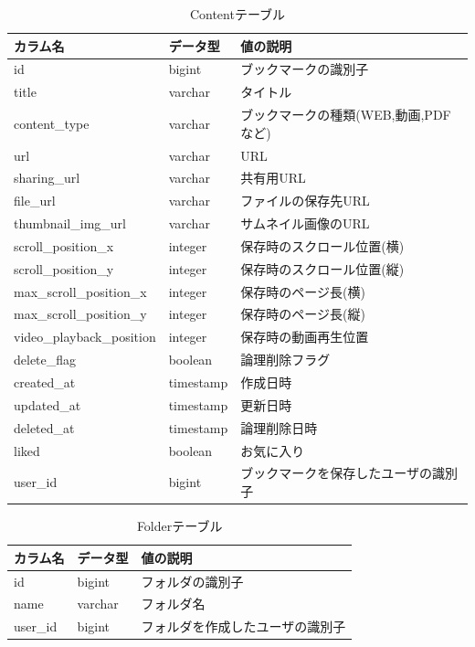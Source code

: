 \begin{table}[htbp]
  \label{tb:design-content-table}
  \caption{Contentテーブル}
  \begin{center}
    \begin{tabular}{|l|l|l|}
      \hline
      カラム名 & データ型 & 値の説明 \\\hline\hline
      id & bigint & ブックマークの識別子 \\\hline
      title & varchar & タイトル \\\hline
      content\_type & varchar & ブックマークの種類(WEB,動画,PDFなど) \\\hline
      url & varchar & URL \\\hline
      sharing\_url & varchar & 共有用URL \\\hline
      file\_url & varchar & ファイルの保存先URL \\\hline
      thumbnail\_img\_url & varchar & サムネイル画像のURL \\\hline
      scroll\_position\_x & integer & 保存時のスクロール位置(横) \\\hline
      scroll\_position\_y & integer & 保存時のスクロール位置(縦) \\\hline
      max\_scroll\_position\_x & integer & 保存時のページ長(横) \\\hline
      max\_scroll\_position\_y & integer & 保存時のページ長(縦) \\\hline
      video\_playback\_position & integer & 保存時の動画再生位置 \\\hline
      delete\_flag & boolean & 論理削除フラグ \\\hline
      created\_at & timestamp & 作成日時 \\\hline
      updated\_at & timestamp & 更新日時 \\\hline
      deleted\_at & timestamp & 論理削除日時 \\\hline
      liked & boolean & お気に入り \\\hline
      user\_id & bigint & ブックマークを保存したユーザの識別子 \\\hline
    \end{tabular}
  \end{center}
\end{table}

\begin{table}[htbp]
  \label{tb:design-folder-table}
  \caption{Folderテーブル}
  \begin{center}
    \begin{tabular}{|l|l|l|}
      \hline
      カラム名 & データ型 & 値の説明 \\\hline\hline
      id & bigint & フォルダの識別子 \\\hline
      name & varchar & フォルダ名 \\\hline
      user\_id & bigint & フォルダを作成したユーザの識別子 \\\hline
    \end{tabular}
  \end{center}
\end{table}

